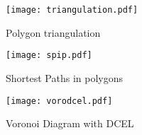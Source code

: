 \documentclass[a4paper,11pt]{article}
\begin{document}
\begin{figure}[ht]
	\centering
	\texttt{[image: triangulation.pdf]}
	\caption{Polygon triangulation}
	\label{figPolygonTriangulation}
\end{figure}

\begin{figure}[ht]
	\centering
	\texttt{[image: spip.pdf]}
	\caption{Shortest Paths in polygons}
	\label{figSPIP}
\end{figure}

\begin{figure}[ht]
	\centering
	\texttt{[image: vorodcel.pdf]}
	\caption{Voronoi Diagram with DCEL}
	\label{figVoroDcel}
\end{figure}
\end{document}
